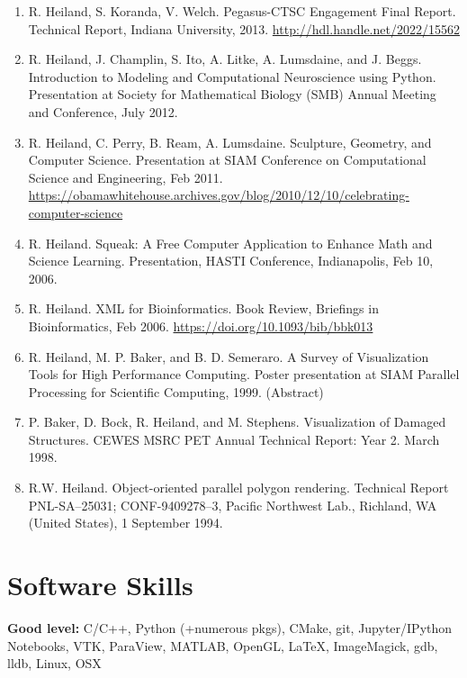 \documentclass[11pt]{article}
\begin{document}
\begin{enumerate}[leftmargin=*, itemsep=3pt, topsep=4pt]
    \item R. Heiland, S. Koranda, V. Welch. Pegasus-CTSC Engagement Final Report. Technical Report, Indiana University, 2013. \url{http://hdl.handle.net/2022/15562}

    \item R. Heiland, J. Champlin, S. Ito, A. Litke, A. Lumsdaine, and J. Beggs. Introduction to Modeling and Computational Neuroscience using Python. Presentation at Society for Mathematical Biology (SMB) Annual Meeting and Conference, July 2012.

    \item R. Heiland, C. Perry, B. Ream, A. Lumsdaine. Sculpture, Geometry, and Computer Science. Presentation at SIAM Conference on Computational Science and Engineering, Feb 2011. \url{https://obamawhitehouse.archives.gov/blog/2010/12/10/celebrating-computer-science}

    \item R. Heiland. Squeak: A Free Computer Application to Enhance Math and Science Learning. Presentation, HASTI Conference, Indianapolis, Feb 10, 2006.

    \item R. Heiland. XML for Bioinformatics. Book Review, Briefings in Bioinformatics, Feb 2006. \url{https://doi.org/10.1093/bib/bbk013}

    \item R. Heiland, M. P. Baker, and B. D. Semeraro. A Survey of Visualization Tools for High Performance Computing. Poster presentation at SIAM Parallel Processing for Scientific Computing, 1999. (Abstract)

    \item P. Baker, D. Bock, R. Heiland, and M. Stephens. Visualization of Damaged Structures. CEWES MSRC PET Annual Technical Report: Year 2. March 1998.

    \item R.W. Heiland. Object-oriented parallel polygon rendering. Technical Report PNL-SA--25031; CONF-9409278--3, Pacific Northwest Lab., Richland, WA (United States), 1 September 1994.
\end{enumerate}

\section*{Software Skills}

\textbf{Good level:} C/C++, Python (+numerous pkgs), CMake, git, Jupyter/IPython Notebooks, VTK, ParaView, MATLAB, OpenGL, \LaTeX, ImageMagick, gdb, lldb, Linux, OSX
\end{document}

